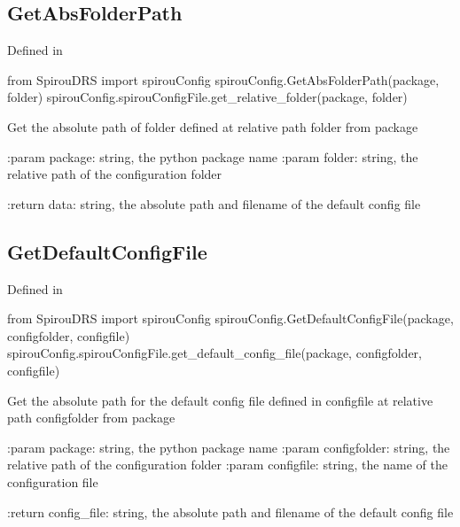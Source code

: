 \begin{minipage}{\textwidth}
\subsection{GetAbsFolderPath}

Defined in \spirouConfig{}

\begin{pythonbox}
from SpirouDRS import spirouConfig
spirouConfig.GetAbsFolderPath(package, folder)
spirouConfig.spirouConfigFile.get_relative_folder(package, folder)
\end{pythonbox}

\begin{pythondocstring}
Get the absolute path of folder defined at relative path
folder from package

:param package: string, the python package name
:param folder: string, the relative path of the configuration folder

:return data: string, the absolute path and filename of the default config
              file
\end{pythondocstring}
\end{minipage}

\begin{minipage}{\textwidth}
\subsection{GetDefaultConfigFile}

Defined in \spirouConfig{}

\begin{pythonbox}
from SpirouDRS import spirouConfig
spirouConfig.GetDefaultConfigFile(package, configfolder, configfile)
spirouConfig.spirouConfigFile.get_default_config_file(package, configfolder, configfile)
\end{pythonbox}

\begin{pythondocstring}
Get the absolute path for the  default config file defined in
configfile at relative path configfolder from package

:param package: string, the python package name
:param configfolder: string, the relative path of the configuration folder
:param configfile: string, the name of the configuration file

:return config_file: string, the absolute path and filename of the
                     default config file
\end{pythondocstring}
\end{minipage}

